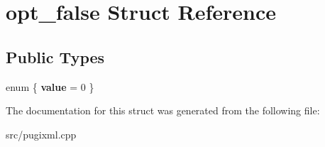 \hypertarget{structopt__false}{}\section{opt\+\_\+false Struct Reference}
\label{structopt__false}
\subsection*{Public Types}
\begin{DoxyCompactItemize}
\item 
\mbox{\label{structopt__false_adf1eb3ad7c3e284bd861d80d6817174f}} 
enum \{ {\bfseries value} = 0
 \}
\end{DoxyCompactItemize}


The documentation for this struct was generated from the following file\+:\begin{DoxyCompactItemize}
\item 
src/pugixml.\+cpp\end{DoxyCompactItemize}
